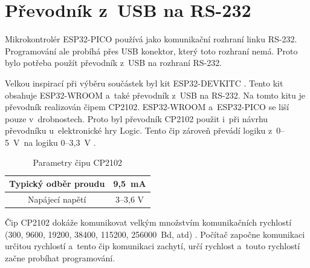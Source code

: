   \section{Převodník z~USB na RS-232}
  Mikrokontrolér ESP32-PICO používá jako komunikační rozhraní linku RS-232. Programování ale probíhá přes USB konektor, který toto rozhraní
  nemá. Proto bylo potřeba použít převodník z~USB na rozhraní RS-232.
  
  Velkou inspirací při výběru součástek byl kit ESP32-DEVKITC \cite{Devkit_schema}. Tento kit obsahuje ESP32-WROOM a~také převodník
  z~USB na RS-232. Na tomto kitu je převodník realizován čipem CP2102. ESP32-WROOM a~ESP32-PICO se liší pouze v~drobnostech. 
  Proto byl převodník CP2102 použit i~při návrhu převodníku u~elektronické hry Logic.  Tento čip zároveň převádí logiku 
  z~0--5~V~na logiku 0--3,3~V \cite{CP2102_datasheet}. 

  \begin{table}[!h]
    \caption{Parametry čipu CP2102 \cite{CP2102_datasheet}}
    \begin{center}
        \begin{tabular}{|c|c|}
            \hline
            Typický odběr proudu   & 9,5~mA \\ 
            \hline
            Napájecí napětí        & 3--3,6 V \\
            \hline
        \end{tabular}    
    \end{center}
  \end{table}

  Čip CP2102 dokáže komunikovat velkým množstvím komunikačních rychlostí (300, 9600, 19200, 38400, 115200, 256000~Bd, atd) 
  \cite{CP2102_datasheet}. Počítač započne komunikaci určitou rychlostí a~tento čip komunikaci zachytí, určí rychlost 
  a~touto rychlostí začne probíhat programování.

